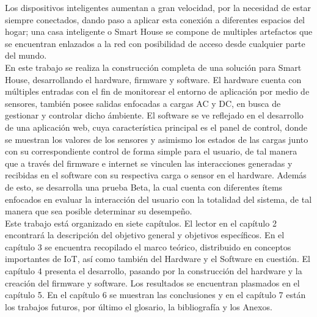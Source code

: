  Los dispositivos inteligentes aumentan a gran velocidad, por la necesidad de estar siempre conectados, dando paso a aplicar esta conexión a diferentes espacios del hogar; una casa inteligente o Smart House se compone de multiples artefactos que se encuentran enlazados a la red con posibilidad de acceso desde cualquier parte del mundo. \\
 
 En este trabajo se realiza la construcción completa de una solución para Smart House, desarrollando el hardware, firmware y software. El hardware cuenta con múltiples entradas con el fin de monitorear el entorno de aplicación por medio de sensores, también posee salidas enfocadas a cargas AC y DC, en busca de gestionar y controlar dicho ámbiente. El software se ve reflejado en el desarrollo de una aplicación web, cuya característica principal es el panel de control, donde se muestran los valores de los sensores y asimismo los estados de las cargas junto con su correspondiente control de forma simple para el usuario, de tal manera que a través del firmware e internet se vinculen las interacciones generadas y recibidas en el software con su respectiva carga o sensor en el hardware. Además de esto, se desarrolla una prueba Beta, la cual cuenta con diferentes ítems enfocados en evaluar la interacción del usuario con la totalidad del sistema, de tal manera que sea posible determinar su desempeño.\\
 
 Este trabajo está organizado en siete capítulos. El lector en el capítulo 2 encontrará la descripción del objetivo general y objetivos específicos. En el capítulo 3 se encuentra recopilado el marco teórico, distribuido en conceptos importantes de IoT, así como también del Hardware y el Software en cuestión. El capítulo 4 presenta el desarrollo, pasando por la construcción del hardware y la creación del firmware y software. Los resultados se encuentran plasmados en el capítulo 5. En el capítulo 6 se muestran las conclusiones y en el capítulo 7 están los trabajos futuros, por último el glosario, la bibliografía y los Anexos.\\
 
